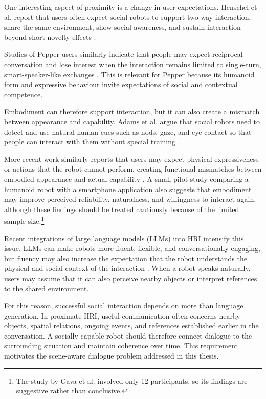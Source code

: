 One interesting aspect of proximity is a change in user expectations. Henschel et al. report that users often expect social robots to support two-way interaction, share the same environment, show social awareness, and sustain interaction beyond short novelty effects \cite[11--12]{henschel_what_2021}.


Studies of Pepper users similarly indicate that people may expect reciprocal conversation and lose interest when the interaction remains limited to single-turn, smart-speaker-like exchanges \cite[12]{henschel_what_2021}. This is relevant for Pepper because its humanoid form and expressive behaviour invite expectations of social and contextual competence.

Embodiment can therefore support interaction, but it can also create a mismatch between appearance and capability. Adams et al. argue that social robots need to detect and use natural human cues such as nods, gaze, and eye contact so that people can interact with them without special training \cite[25]{adams_humanoid_2000}.

More recent work similarly reports that users may expect physical expressiveness or actions that the robot cannot perform, creating functional mismatches between embodied appearance and actual capability \cite{app15116377}. A small pilot study comparing a humanoid robot with a smartphone application also suggests that embodiment may improve perceived reliability, naturalness, and willingness to interact again, although these findings should be treated cautiously because of the limited sample size.\footnote{The study by Gava et al. involved only 12 participants, so its findings are suggestive rather than conclusive.} \cite{gava2024physical}

Recent integrations of large language models (LLMs) into HRI intensify this issue. LLMs can make robots more fluent, flexible, and conversationally engaging, but fluency may also increase the expectation that the robot understands the physical and social context of the interaction \cite{kim_understanding_2024,atuhurra_leveraging_2024}. When a robot speaks naturally, users may assume that it can also perceive nearby objects or interpret references to the shared environment.

For this reason, successful social interaction depends on more than language generation. In proximate HRI, useful communication often concerns nearby objects, spatial relations, ongoing events, and references established earlier in the conversation. A socially capable robot should therefore connect dialogue to the surrounding situation and maintain coherence over time. This requirement motivates the scene-aware dialogue problem addressed in this thesis.

